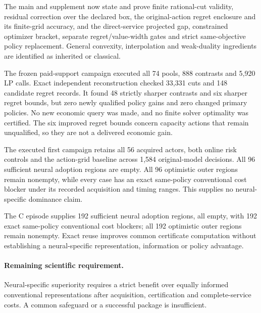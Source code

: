 The main and supplement now state and prove finite rational-cut validity, residual correction over the declared box, the original-action regret enclosure and its finite-grid accuracy, and the direct-service projected gap, constrained optimizer bracket, separate regret/value-width gates and strict same-objective policy replacement. General convexity, interpolation and weak-duality ingredients are identified as inherited or classical.\par
The frozen paid-support campaign executed all 74 pools, 888 contrasts and 5,920 LP calls. Exact independent reconstruction checked 33,331 cuts and 148 candidate regret records. It found 48 strictly sharper contrasts and six sharper regret bounds, but zero newly qualified policy gains and zero changed primary policies. No new economic query was made, and no finite solver optimality was certified. The six improved regret bounds concern capacity actions that remain unqualified, so they are not a delivered economic gain.\par
The executed first campaign retains all 56 acquired actors, both online risk controls and the action-grid baseline across 1,584 original-model decisions. All 96 sufficient neural adoption regions are empty. All 96 optimistic outer regions remain nonempty, while every case has an exact same-policy conventional cost blocker under its recorded acquisition and timing ranges. This supplies no neural-specific dominance claim.\par
The C episode supplies 192 sufficient neural adoption regions, all empty, with 192 exact same-policy conventional cost blockers; all 192 optimistic outer regions remain nonempty. Exact reuse improves common certificate computation without establishing a neural-specific representation, information or policy advantage.\par

\paragraph{Remaining scientific requirement.} Neural-specific superiority requires a strict benefit over equally informed conventional representations after acquisition, certification and complete-service costs. A common safeguard or a successful package is insufficient.

